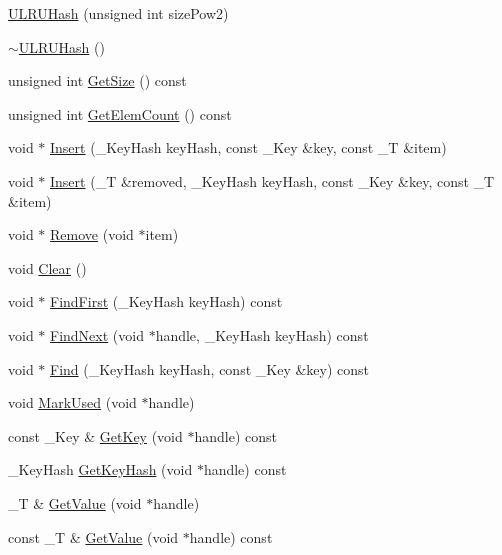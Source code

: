 \begin{CompactItemize}
\item 
\hyperlink{class_u_l_r_u_hash_64b8501e537b7805aab37bd0d45ee5d0}{ULRUHash} (unsigned int sizePow2)
\item 
\hyperlink{class_u_l_r_u_hash_b208b6347de680be8a5fb0ac3459c908}{$\sim$ULRUHash} ()
\item 
unsigned int \hyperlink{class_u_l_r_u_hash_7d623f663f2644180432bd29c9fdd801}{GetSize} () const 
\item 
unsigned int \hyperlink{class_u_l_r_u_hash_a2e102da1f9a2579533a429b535e9ded}{GetElemCount} () const 
\item 
void $\ast$ \hyperlink{class_u_l_r_u_hash_ad3291d30433c9dfc058f4ea14f4aa52}{Insert} (\_\-KeyHash keyHash, const \_\-Key \&key, const \_\-T \&item)
\item 
void $\ast$ \hyperlink{class_u_l_r_u_hash_1f01c54091d166f1f32e4981f00a311b}{Insert} (\_\-T \&removed, \_\-KeyHash keyHash, const \_\-Key \&key, const \_\-T \&item)
\item 
void $\ast$ \hyperlink{class_u_l_r_u_hash_622e00cdeeb6004d61142319db0e1741}{Remove} (void $\ast$item)
\item 
void \hyperlink{class_u_l_r_u_hash_180a90b26ca19f3e6cba92080fd88f40}{Clear} ()
\item 
void $\ast$ \hyperlink{class_u_l_r_u_hash_6853ac9489e5fa1192f0ed080b149b1f}{FindFirst} (\_\-KeyHash keyHash) const 
\item 
void $\ast$ \hyperlink{class_u_l_r_u_hash_f12a2f713bc64feffdaa15cc64137a9e}{FindNext} (void $\ast$handle, \_\-KeyHash keyHash) const 
\item 
void $\ast$ \hyperlink{class_u_l_r_u_hash_90f2e020b3aad0abebf75c84de57cfbc}{Find} (\_\-KeyHash keyHash, const \_\-Key \&key) const 
\item 
void \hyperlink{class_u_l_r_u_hash_a4863fdfd290e1a381bcc77025698f11}{MarkUsed} (void $\ast$handle)
\item 
const \_\-Key \& \hyperlink{class_u_l_r_u_hash_654d4c16c061e15cd05d4b3a06720517}{GetKey} (void $\ast$handle) const 
\item 
\_\-KeyHash \hyperlink{class_u_l_r_u_hash_bef81214ae7f386a7259178ee4308b99}{GetKeyHash} (void $\ast$handle) const 
\item 
\_\-T \& \hyperlink{class_u_l_r_u_hash_956f682dbfdc15c021d6653e045b51fb}{GetValue} (void $\ast$handle)
\item 
const \_\-T \& \hyperlink{class_u_l_r_u_hash_84fe767898f076199811f7ad2bfe68f6}{GetValue} (void $\ast$handle) const 

\end{CompactItemize}
